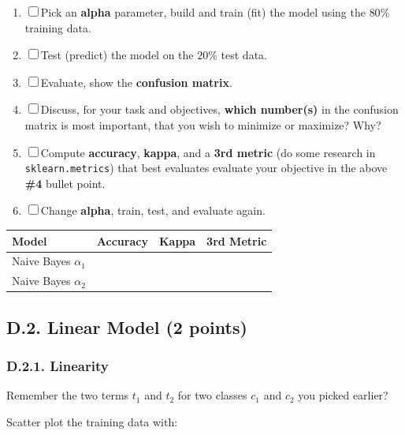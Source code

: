 \documentclass[
  letterpaper,
]{scrbook}
\newcounter{none} %
\providecommand{\tightlist}{%
  \setlength{\itemsep}{0pt}\setlength{\parskip}{0pt}}
\begin{document}
\begin{enumerate}
\def\labelenumi{\arabic{enumi}.}
\tightlist
\item
  ☐ Pick an \textbf{alpha} parameter, build and train (fit) the model
  using the \(80\%\) training data.
\item
  ☐ Test (predict) the model on the \(20\%\) test data.
\item
  ☐ Evaluate, show the \textbf{confusion matrix}.
\item
  ☐ Discuss, for your task and objectives, \textbf{which number(s)} in
  the confusion matrix is most important, that you wish to minimize or
  maximize? Why?
\item
  ☐ Compute \textbf{accuracy}, \textbf{kappa}, and a \textbf{3rd metric}
  (do some research in \texttt{sklearn.metrics}) that best evaluates
  evaluate your objective in the above \textbf{\#4} bullet point.
\item
  ☐ Change \textbf{alpha}, train, test, and evaluate again.
\end{enumerate}

{\def\LTcaptype{none} %
\begin{longtable}[]{@{}llll@{}}
\toprule\noalign{}
Model & Accuracy & Kappa & 3rd Metric \\
\midrule\noalign{}
\endhead
\bottomrule\noalign{}
\endlastfoot
Naive Bayes \(\alpha_1\) & & & \\
Naive Bayes \(\alpha_2\) & & & \\
\end{longtable}
}

\subsection*{D.2. Linear Model (2
points)}\label{d.2.-linear-model-2-points}

\subsubsection*{D.2.1. Linearity}\label{d.2.1.-linearity}

Remember the two terms \(t_1\) and \(t_2\) for two classes \(c_1\) and
\(c_2\) you picked earlier?

Scatter plot the training data with:
\end{document}

